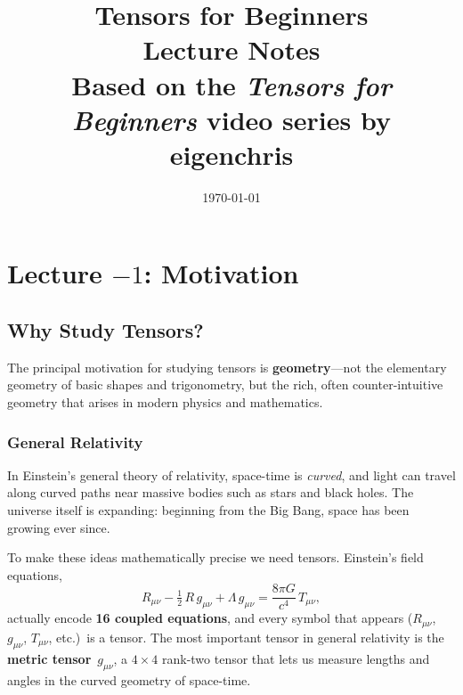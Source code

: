 \documentclass[12pt, a4paper]{report}
\title{%
    \vspace{-1cm}
    {\Huge\bfseries Tensors for Beginners}\\[0.8em]
    {\Large Lecture Notes}\\[0.4em]
    {\normalsize Based on the \emph{Tensors for Beginners} video series by eigenchris}
}
\author{}
\date{\today}
\theoremstyle{definition}
\theoremstyle{plain}
\theoremstyle{remark}
\begin{document}
\maketitle
\tableofcontents
\newpage

\setcounter{chapter}{-2}          %
\chapter*{Lecture $-1$: Motivation}

\section*{Why Study Tensors?}

The principal motivation for studying tensors is \textbf{geometry}---not the elementary
geometry of basic shapes and trigonometry, but the rich, often counter-intuitive
geometry that arises in modern physics and mathematics.

\subsection*{General Relativity}

In Einstein's general theory of relativity, space-time is \emph{curved}, and light
can travel along curved paths near massive bodies such as stars and black holes.
The universe itself is expanding: beginning from the Big Bang, space has been
growing ever since.

To make these ideas mathematically precise we need tensors.  Einstein's field
equations,
\begin{equation}
    R_{\mu\nu} - \tfrac{1}{2}\,R\,g_{\mu\nu} + \Lambda\,g_{\mu\nu}
    = \frac{8\pi G}{c^{4}}\,T_{\mu\nu},
\end{equation}
actually encode \textbf{16 coupled equations}, and every symbol that appears
($R_{\mu\nu}$, $g_{\mu\nu}$, $T_{\mu\nu}$, etc.)\ is a tensor.  The most
important tensor in general relativity is the \textbf{metric tensor}~$g_{\mu\nu}$,
a $4\times 4$ rank-two tensor that lets us measure lengths and angles in the curved
geometry of space-time.
\end{document}
